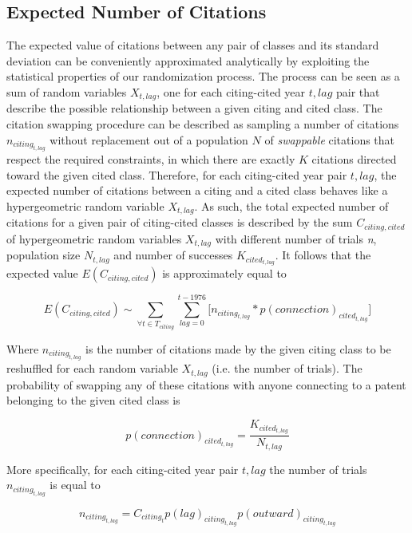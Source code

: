 \documentclass[]{svjour3}
\begin{document}
\subsection{Expected Number of Citations}
The expected value of citations between any pair of classes and its standard deviation can be conveniently approximated analytically by exploiting the statistical properties of our randomization process. The process can be seen as a sum of random variables $X_{t,lag}$, one for each citing-cited year ${t,lag}$ pair that describe the possible relationship between a given citing and cited class. The citation swapping procedure can be described as sampling a number of citations $n_{citing_{t,lag}}$ without replacement out of a population $N$ of \textit{swappable} citations that respect the required constraints, in which there are exactly $K$ citations directed toward the given cited class. Therefore, for each citing-cited year pair ${t,lag}$, the expected number of citations between a citing and a cited class behaves like a hypergeometric random variable $X_{t,lag}$. As such, the total expected number of citations for a given pair of citing-cited classes is described by the sum ${C_{citing,cited}}$ of hypergeometric random variables ${X_{t,lag}}$ with different number of trials \textit{n}, population size $N_{t,lag}$ and number of successes $K_{cited_{t,lag}}$. It follows that the expected value $E(C_{citing,cited})$ is approximately equal to

\begin{equation}
E(C_{citing,cited}) \sim \sum_{\forall t \in T_{citing}}\sum_{lag=0}^{t-1976} \bigl[ n_{citing_{t,lag}} * p(connection)_{cited_{t,lag}} \bigr]
\end{equation}\label{expected_value_citation}


Where $n_{citing_{t,lag}}$ is the number of citations made by the given citing class to be reshuffled for each random variable $X_{t,lag}$ (i.e. the number of trials). The probability of swapping any of these citations with anyone connecting to a patent belonging to the given cited class is

\begin{equation}
p(connection)_{cited_{t,lag}} = \frac{K_{cited_{t,lag}}}{N_{t,lag}}
\end{equation}\label{probability_connection}

More specifically, for each citing-cited year pair ${t,lag}$ the number of trials $n_{citing_{t,lag}}$ is equal to

\begin{equation}
n_{citing_{t,lag}} = C_{citing_{t}} p(lag)_{citing_{t,lag}} p(outward)_{citing_{t,lag}}
\end{equation}\label{number_of_trials}
\end{document}
